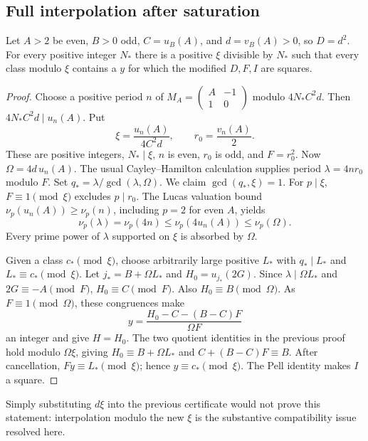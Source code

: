 \subsection{Full interpolation after saturation}
\begin{theorem}\label{thm:interpolate}
Let $A>2$ be even, $B>0$ odd, $C=u_B(A)$, and $d=v_B(A)>0$, so $D=d^2$.
For every positive integer $N_*$ there is a positive $\xi$ divisible by
$N_*$ such that every class modulo $\xi$ contains a $y$ for which the
modified $D,F,I$ are squares.
\end{theorem}
\begin{proof}
Choose a positive period $n$ of
$M_A=\left(\begin{smallmatrix}A&-1\\1&0\end{smallmatrix}\right)$ modulo
$4N_*C^2d$. Then $4N_*C^2d\mid u_n(A)$. Put
\[
 \xi=\frac{u_n(A)}{4C^2d},\qquad r_0=\frac{v_n(A)}2.
\]
These are positive integers, $N_*\mid\xi$, $n$ is even, $r_0$ is odd,
and $F=r_0^2$. Now $\Omega=4d\,u_n(A)$. The usual
Cayley--Hamilton calculation supplies period $\lambda=4nr_0$ modulo $F$.
Set $q_*=\lambda/\gcd(\lambda,\Omega)$. We claim
$\gcd(q_*,\xi)=1$.
For $p\mid\xi$, $F\equiv1\pmod\xi$ excludes $p\mid r_0$.
The Lucas valuation bound
$\nu_p(u_n(A))\ge\nu_p(n)$, including $p=2$ for even $A$, yields
\[
 \nu_p(\lambda)=\nu_p(4n)\le\nu_p(4u_n(A))\le\nu_p(\Omega).
\]
Every prime power of $\lambda$ supported on $\xi$ is absorbed by $\Omega$.

Given a class $c_*\pmod\xi$, choose arbitrarily large positive $L_*$
with $q_*\mid L_*$ and $L_*\equiv c_*\pmod\xi$.
Let $j_*=B+\Omega L_*$ and $H_0=u_{j_*}(2G)$.
Since $\lambda\mid\Omega L_*$ and $2G\equiv-A\pmod F$,
$H_0\equiv C\pmod F$. Also $H_0\equiv B\pmod\Omega$.
As $F\equiv1\pmod\Omega$, these congruences make
\[
 y=\frac{H_0-C-(B-C)F}{\Omega F}
\]
an integer and give $H=H_0$. The two quotient identities in the previous
proof hold modulo $\Omega\xi$, giving
$H_0\equiv B+\Omega L_*$ and $C+(B-C)F\equiv B$.
After cancellation, $Fy\equiv L_*\pmod\xi$; hence
$y\equiv c_*\pmod\xi$. The Pell identity makes $I$ a square.
\end{proof}
Simply substituting $d\xi$ into the previous certificate would not prove
this statement: interpolation modulo the new $\xi$ is the substantive
compatibility issue resolved here.

